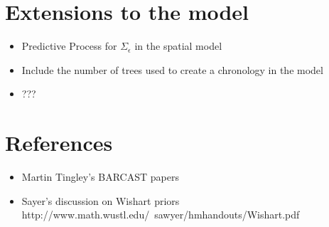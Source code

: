 \documentclass{article}\usepackage[]{graphicx}\usepackage[]{color}
\def\bm#1{\mbox{\boldmath $#1$}}
\begin{document}
\section{Extensions to the model}
%
\begin{itemize}
%
\item Predictive Process for $\Sigma_\epsilon$ in the spatial model
\item Include the number of trees used to create a chronology in the model
\item ???
%
\end{itemize}
% 
\section{References}
\begin{itemize}
\item Martin Tingley's BARCAST papers
\item  Sayer's discussion on Wishart priors http://www.math.wustl.edu/~sawyer/hmhandouts/Wishart.pdf
\end{itemize}
\end{document}
